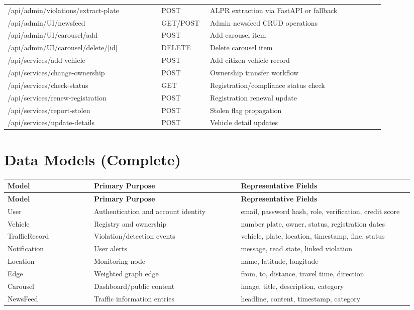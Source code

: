 \documentclass[12pt]{article}
\begin{document}
\begin{longtable}{p{0.38\linewidth} p{0.12\linewidth} p{0.43\linewidth}}
/api/admin/violations/extract-plate & POST & ALPR extraction via FastAPI or fallback \\
/api/admin/UI/newsfeed & GET/POST & Admin newsfeed CRUD operations \\
/api/admin/UI/carousel/add & POST & Add carousel item \\
/api/admin/UI/carousel/delete/[id] & DELETE & Delete carousel item \\
/api/services/add-vehicle & POST & Add citizen vehicle record \\
/api/services/change-ownership & POST & Ownership transfer workflow \\
/api/services/check-status & GET & Registration/compliance status check \\
/api/services/renew-registration & POST & Registration renewal update \\
/api/services/report-stolen & POST & Stolen flag propagation \\
/api/services/update-details & POST & Vehicle detail updates \\
\bottomrule
\end{longtable}

\section{Data Models (Complete)}
\begin{longtable}{p{0.20\linewidth} p{0.34\linewidth} p{0.40\linewidth}}
\toprule
\textbf{Model} & \textbf{Primary Purpose} & \textbf{Representative Fields} \\
\midrule
\endfirsthead
\toprule
\textbf{Model} & \textbf{Primary Purpose} & \textbf{Representative Fields} \\
\midrule
\endhead
User & Authentication and account identity & email, password hash, role, verification, credit score \\
Vehicle & Registry and ownership & number plate, owner, status, registration dates \\
TrafficRecord & Violation/detection events & vehicle, plate, location, timestamp, fine, status \\
Notification & User alerts & message, read state, linked violation \\
Location & Monitoring node & name, latitude, longitude \\
Edge & Weighted graph edge & from, to, distance, travel time, direction \\
Carousel & Dashboard/public content & image, title, description, category \\
NewsFeed & Traffic information entries & headline, content, timestamp, category \\
\bottomrule
\end{longtable}
\end{document}
